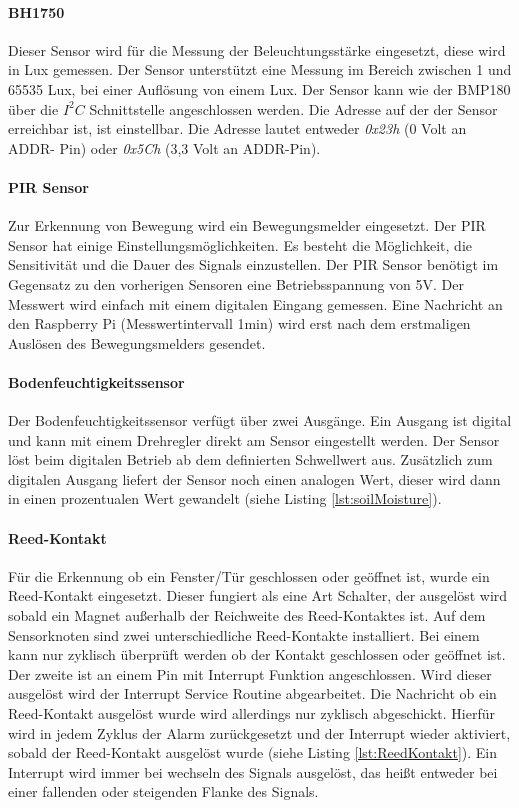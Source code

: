 \paragraph{BH1750} Dieser Sensor wird für die Messung der Beleuchtungsstärke eingesetzt, diese wird in Lux gemessen. Der Sensor unterstützt eine Messung im Bereich zwischen 1 und 65535 Lux, bei einer Auflösung von einem Lux. Der Sensor kann wie der BMP180 über die $I^2C$ Schnittstelle angeschlossen werden. Die Adresse auf der der Sensor erreichbar ist, ist einstellbar. Die Adresse lautet entweder \textit{0x23h} (0 Volt an ADDR- Pin) oder \textit{0x5Ch} (3,3 Volt an ADDR-Pin). 
\paragraph{PIR Sensor} Zur Erkennung von Bewegung wird ein Bewegungsmelder eingesetzt. Der PIR Sensor hat einige Einstellungsmöglichkeiten. Es besteht die Möglichkeit, die Sensitivität und die Dauer des Signals einzustellen. Der PIR Sensor benötigt im Gegensatz zu den vorherigen Sensoren eine Betriebsspannung von 5V. Der Messwert wird einfach mit einem digitalen Eingang gemessen. Eine Nachricht an den Raspberry Pi (Messwertintervall 1min) wird erst nach dem erstmaligen Auslösen des Bewegungsmelders gesendet.
\paragraph{Bodenfeuchtigkeitssensor} Der Bodenfeuchtigkeitssensor verfügt über zwei Ausgänge. Ein Ausgang ist digital und kann mit einem Drehregler direkt am Sensor eingestellt werden. Der Sensor löst beim digitalen Betrieb ab dem definierten Schwellwert aus. Zusätzlich zum digitalen Ausgang liefert der Sensor noch einen analogen Wert, dieser wird dann in einen prozentualen Wert gewandelt (siehe Listing \ref{lst:soilMoisture}). 


\paragraph{Reed-Kontakt} Für die Erkennung ob ein Fenster/Tür geschlossen oder geöffnet ist, wurde ein Reed-Kontakt eingesetzt. Dieser fungiert als eine Art Schalter, der ausgelöst wird sobald ein Magnet außerhalb der Reichweite des Reed-Kontaktes ist. Auf dem Sensorknoten sind zwei unterschiedliche Reed-Kontakte installiert. Bei einem kann nur zyklisch überprüft werden ob der Kontakt geschlossen oder geöffnet ist. Der zweite ist an einem Pin mit Interrupt Funktion angeschlossen. Wird dieser ausgelöst wird der Interrupt Service Routine abgearbeitet. Die Nachricht ob ein Reed-Kontakt ausgelöst wurde wird allerdings nur zyklisch abgeschickt. Hierfür wird in jedem Zyklus der Alarm zurückgesetzt und der Interrupt wieder aktiviert, sobald der Reed-Kontakt ausgelöst wurde (siehe Listing \ref{lst:ReedKontakt}). Ein Interrupt wird immer bei wechseln des Signals ausgelöst, das heißt entweder bei einer fallenden oder steigenden Flanke des Signals.

